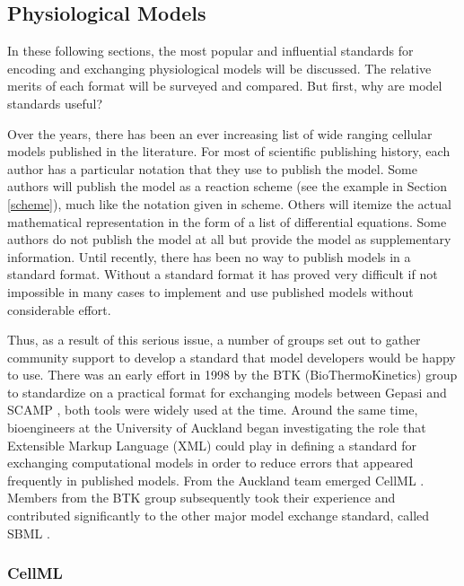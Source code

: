 \documentclass[]{article}
\begin{document}
\subsection{Physiological Models}

In these following sections, the most popular and influential standards
for encoding and exchanging physiological models will be discussed. The
relative merits of each format will be surveyed and compared. But first,
why are model standards useful?

Over the years, there has been an ever increasing list of wide ranging
cellular models published in the literature. For most of scientific
publishing history, each author has a particular notation that they use
to publish the model. Some authors will publish the model as a reaction
scheme (see the example in Section \ref{scheme}), much like the notation
given in scheme. Others will itemize the actual mathematical
representation in the form of a list of differential equations. Some
authors do not publish the model at all but provide the model as
supplementary information. Until recently, there has been no way to
publish models in a standard format. Without a standard format it has
proved very difficult if not impossible in many cases to implement and
use published models without considerable effort.

Thus, as a result of this serious issue, a number of groups set out to
gather community support to develop a standard that model developers
would be happy to use. There was an early effort in 1998 by the BTK
(BioThermoKinetics) group to standardize on a practical format for
exchanging models between Gepasi \autocite{Gepasi:1993} and SCAMP
\autocite{SauroF91}, both tools were widely used at the time. Around the
same time, bioengineers at the University of Auckland began
investigating the role that Extensible Markup Language (XML)
\autocite{harold:2001} could play in defining a standard for exchanging
computational models in order to reduce errors that appeared frequently
in published models. From the Auckland team emerged CellML
\autocite{LloydCellML2004}. Members from the BTK group subsequently took
their experience and contributed significantly to the other major model
exchange standard, called SBML \autocite{hucka:2002d}.

\subsubsection{CellML}
\end{document}

